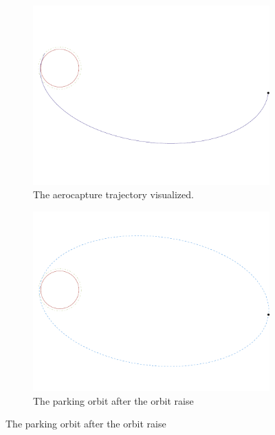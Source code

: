 \begin{figure}
	\begin{subfigure}[b]{0.7\textwidth}
		\vspace{-22mm}
		\includegraphics[width=\textwidth]{./Figure/Orbit/aerocapture_trajectory.pdf}
		\vspace{-25mm}
		\caption{The aerocapture trajectory visualized.}
		\label{fig:capture_trajectory}
	\end{subfigure}
	\begin{subfigure}[b]{0.7\textwidth}
		\vspace{-10mm}
		\includegraphics[width=\textwidth]{./Figure/Orbit/parking_trajectory.pdf}
		\vspace{-15mm}
		\caption{The parking orbit after the orbit raise}

\end{subfigure}
\end{figure}
